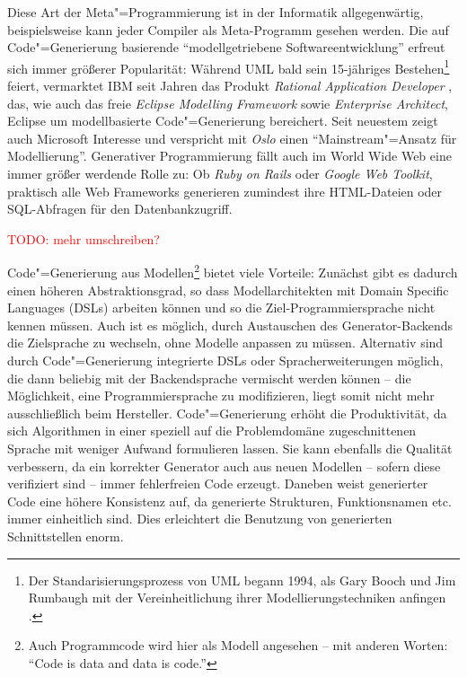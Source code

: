 \documentclass[12pt, a4paper, bibgerm]{scrbook}
\newcommand{\todo}[1]{
  \textcolor{red}{TODO: #1}
}
\newcommand{\cgen}{Code"=Generierung}
\newcommand{\mprog}{Meta"=Programmierung}
\begin{document}
Diese Art der \mprog{} ist in der Informatik allgegenwärtig,
beispielsweise kann jeder Compiler als Meta-Programm gesehen werden. Die
auf \cgen{} basierende ``modellgetriebene Softwareentwicklung'' erfreut
sich immer größerer Popularität: Während UML \cite{UML} bald sein
15-jähriges Bestehen\footnote{Der Standarisierungsprozess von UML begann
  1994, als Gary Booch und Jim Rumbaugh mit der Vereinheitlichung ihrer
  Modellierungstechniken anfingen \cite[S. 17]{UML}.} feiert, vermarktet
IBM seit Jahren das Produkt \textit{Rational Application Developer}
\cite{RAD}, das, wie auch das freie \textit{Eclipse Modelling
  Framework} sowie \textit{Enterprise Architect}, Eclipse um
modellbasierte \cgen{} bereichert. Seit neuestem zeigt auch Microsoft
Interesse und verspricht mit \textit{Oslo}  \cite{Oslo} einen
``Mainstream"=Ansatz für Modellierung''. Generativer Programmierung
fällt auch im World Wide Web eine immer größer werdende Rolle zu: Ob
\textit{Ruby on Rails} oder \textit{Google Web Toolkit}, praktisch alle
Web Frameworks generieren zumindest ihre HTML-Dateien oder SQL-Abfragen
für den Datenbankzugriff.

\todo{mehr umschreiben?}

\cgen{} aus Modellen\footnote{Auch Programmcode wird hier als Modell
  angesehen -- mit anderen Worten: "`Code is data and data is code."'}
bietet viele Vorteile: Zunächst gibt es dadurch einen höheren
Abstraktionsgrad, so dass Modellarchitekten mit Domain Specific
Languages (DSLs) arbeiten können und so die Ziel-Programmiersprache
nicht kennen müssen. Auch ist es möglich, durch Austauschen des
Generator-Backends die Zielsprache zu wechseln, ohne Modelle anpassen zu
müssen. Alternativ sind durch \cgen{} integrierte DSLs oder
Spracherweiterungen möglich, die dann beliebig mit der Backendsprache
vermischt werden können -- die Möglichkeit, eine Programmiersprache zu
modifizieren, liegt somit nicht mehr ausschließlich beim
Hersteller. \cgen{} erhöht die Produktivität, da sich Algorithmen in
einer speziell auf die Problemdomäne zugeschnittenen Sprache mit weniger
Aufwand formulieren lassen. Sie kann ebenfalls die Qualität verbessern, da ein
korrekter Generator auch aus neuen Modellen -- sofern diese verifiziert
sind -- immer fehlerfreien Code erzeugt. Daneben weist generierter Code eine
höhere Konsistenz auf, da generierte Strukturen, Funktionsnamen
etc. immer einheitlich sind. Dies erleichtert die Benutzung von
generierten Schnittstellen enorm.
\end{document}

